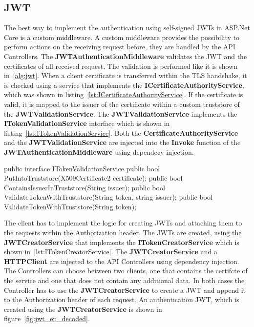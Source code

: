 \subsection{JWT}
The best way to implement the authentication using self-signed JWTs in ASP.Net Core is a custom middleware.
A custom middleware provides the possibility to perform actions on the receiving request before, they are handled by the API Controllers.
The \textbf{JWTAuthenticationMiddleware} validates the JWT and the certificates of all received request.
The validation is performed like it is shown in~\ref{alg:jwt}.
When a client certificate is transferred within the TLS handshake, it is checked using a service that implements the \textbf{ICertificateAuthorityService}, which was shown in listing~\ref{lst:ICertificateAuthorityService}.
If the certificate is valid, it is mapped to the issuer of the certificate within a custom truststore of the \textbf{JWTValidationService}.
The \textbf{JWTValidationService} implements the \textbf{ITokenValidationService} interface which is shown in listing~\ref{lst:ITokenValidationService}.
Both the \textbf{CertificateAuthorityService} and the \textbf{JWTValidationService} are injected into the \textbf{Invoke} function of the \textbf{JWTAuthenticationMiddleware} using dependecy injection.

\noindent \begin{minipage}{\linewidth}
	\begin{CsCode}[label={lst:ITokenValidationService}, caption={ITokenValidationService interface, which is implemented by the injected JWTValidationService},captionpos=b]
		public interface ITokenValidationService {
			public bool PutIntoTruststore(X509Certificate2 certificate);
			public bool ContainsIssuerInTruststore(String issuer);
			public bool ValidateTokenWithTruststore(String token, string issuer);
			public bool ValidateTokenWithTruststore(String token);
		}
	\end{CsCode}
\end{minipage}

The client has to implement the logic for creating JWTs and attaching them to the requests within the Authorization header.
The JWTs are created, using the \textbf{JWTCreatorService} that implements the \textbf{ITokenCreatorService} which is shown in~\ref{lst:ITokenCreatorService}.
The \textbf{JWTCreatorService} and a \textbf{HTTPClient} are injected to the API Controllers using dependency injection.
The Controllers can choose between two clients, one that contains the certifcte of the service and one that does not contain any additional data.
In both cases the Controller has to use the \textbf{JWTCreatorService} to create a JWT and append it to the Authorization header of each request.
An authentication JWT, which is created using the \textbf{JWTCreatorService} is shown in figure~\ref{fig:jwt_en_decoded}.

